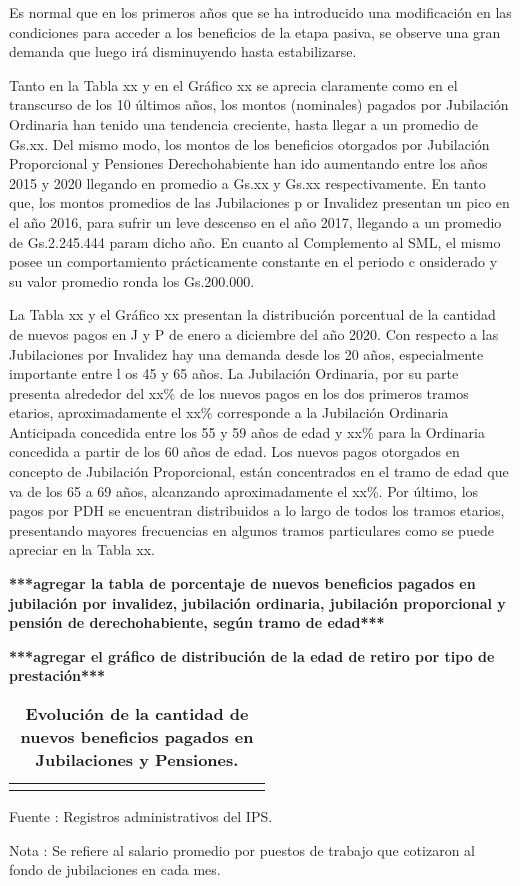 Es normal que en los primeros años que se ha introducido una
modificación en las condiciones para acceder a los beneficios de la
etapa pasiva, se observe una gran demanda que luego irá disminuyendo
hasta estabilizarse.

Tanto en la Tabla xx y en el Gráfico xx se aprecia claramente como en el
transcurso de los 10 últimos años, los montos (nominales) pagados por
Jubilación Ordinaria han tenido una tendencia creciente, hasta llegar a
un promedio de Gs.xx. Del mismo modo, los montos de los beneficios
otorgados por Jubilación Proporcional y Pensiones Derechohabiente han
ido aumentando entre los años 2015 y 2020 llegando en promedio a Gs.xx y
Gs.xx respectivamente. En tanto que, los montos promedios de las
Jubilaciones p or Invalidez presentan un pico en el año 2016, para
sufrir un leve descenso en el año 2017, llegando a un promedio de
Gs.2.245.444 param dicho año. En cuanto al Complemento al SML, el mismo
posee un comportamiento prácticamente constante en el periodo c
onsiderado y su valor promedio ronda los Gs.200.000.

La Tabla xx y el Gráfico xx presentan la distribución porcentual de la
cantidad de nuevos pagos en J y P de enero a diciembre del año 2020. Con
respecto a las Jubilaciones por Invalidez hay una demanda desde los 20
años, especialmente importante entre l os 45 y 65 años. La Jubilación
Ordinaria, por su parte presenta alrededor del xx\% de los nuevos pagos
en los dos primeros tramos etarios, aproximadamente el xx\% corresponde
a la Jubilación Ordinaria Anticipada concedida entre los 55 y 59 años de
edad y xx\% para la Ordinaria concedida a partir de los 60 años de edad.
Los nuevos pagos otorgados en concepto de Jubilación Proporcional, están
concentrados en el tramo de edad que va de los 65 a 69 años, alcanzando
aproximadamente el xx\%. Por último, los pagos por PDH se encuentran
distribuidos a lo largo de todos los tramos etarios, presentando mayores
frecuencias en algunos tramos particulares como se puede apreciar en la
Tabla xx.

\textbf{***agregar la tabla de porcentaje de nuevos beneficios pagados en jubilación por invalidez, jubilación ordinaria, jubilación proporcional y pensión de derechohabiente, según tramo de edad***}

\textbf{***agregar el gráfico de distribución de la edad de retiro por tipo de prestación***}

\begin{table}[H]
\begin{center}
\caption{\bf{Evolución de la cantidad de nuevos beneficios pagados en Jubilaciones y Pensiones.}}
\begin{tabular}{l|rrrrrrrrrrrrrrr}
\scriptsize
%
\end{tabular}
                    \item \footnotesize Fuente : Registros administrativos del IPS. 
                    \item \footnotesize Nota : Se refiere al salario promedio por puestos de trabajo que cotizaron al fondo de jubilaciones en cada mes.
\end{center}
\end{table}

